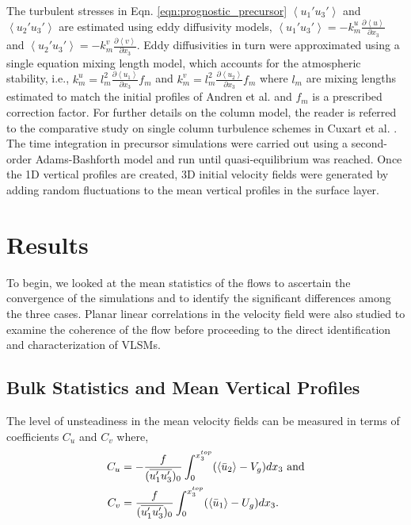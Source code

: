 The turbulent stresses in Eqn. \ref{eqn:prognostic_precursor} $\left < u_{1}'u_{3}' \right >$ and $\left < u_{2}'u_{3}' \right >$ are estimated using eddy diffusivity models, $\left < u_{1}'u_{3}' \right > = -k_{m}^{u}\frac{\partial \left < u \right >}{\partial x_3}$ and $\left < u_{2}'u_{3}' \right > =-k_m^{v}\frac{\partial \left < v \right >}{\partial x_3}$. Eddy diffusivities in turn were approximated using a single equation mixing length model, which accounts for the atmospheric stability, i.e., $k_m^{u} = l_m^2\frac{\partial \left < u_{1} \right >}{\partial x_3}f_m$ and $k_m^{v} = l_m^2\frac{\partial \left < u_{2}\right >}{\partial x_3}f_m$ where $l_m$ are mixing lengths estimated to match the initial profiles of Andren et al.\cite{andren_brown_qjrm_94} and $f_m$ is a prescribed correction factor. For further details on the column model, the reader is referred to the comparative study on single column turbulence schemes in Cuxart et al. \cite{cuxart_blm_2006}. The time integration in precursor simulations were carried out using a second-order Adams-Bashforth model and run until quasi-equilibrium was reached. Once the 1D vertical profiles are created, 3D initial velocity fields were generated by adding random fluctuations to the mean vertical profiles in the surface layer. 

\section{Results}
To begin, we looked at the mean statistics of the flows to ascertain the convergence of the simulations and to identify the significant differences among the three cases. Planar linear correlations in the velocity field were also studied to examine the coherence of the flow before proceeding to the direct identification and characterization of VLSMs. 
\subsection{Bulk Statistics and Mean Vertical Profiles}

The level of unsteadiness in the mean velocity fields can be measured in terms of  coefficients $C_u$ and $C_v$ where, 
\begin{align}
C_u & = -\frac{f}{(\overline{u_{1}'u_{3}'})_{0}}\int_{0}^{x_3^{top}}(\left< \bar{u}_{2} \right > - V_g)dx_3 \ \text{and} \notag \\
C_v & = \frac{f}{(\overline{u_{1}'u_{3}'})_0}\int_{0}^{x_3^{top}}(\left< \bar{u}_{1} \right > - U_g)dx_3. 
\label{eqn:cu-cv}
\end{align}

